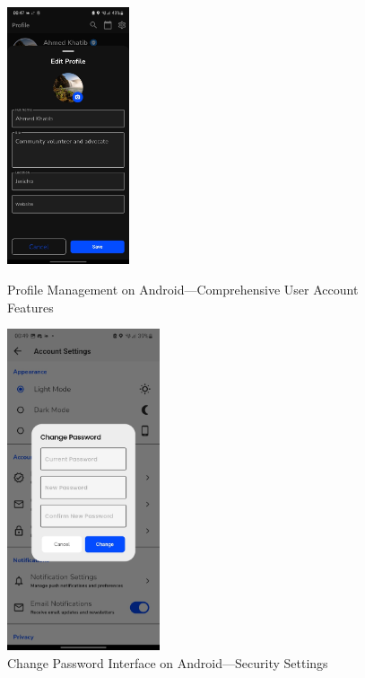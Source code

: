 \begin{figure}[!htbp]
{        \includegraphics[width=0.32\textwidth]{figures/ui/edit_profile_android.jpeg}
    }
    \caption{Profile Management on Android---Comprehensive User Account Features}\label{fig:android_profile_management}
\end{figure}

\begin{figure}[!htbp]
    \centering
    \includegraphics[width=0.4\textwidth]{figures/ui/change_password_settings_android.jpeg}
    \caption{Change Password Interface on Android---Security Settings}\label{fig:android_change_password}
\end{figure}

